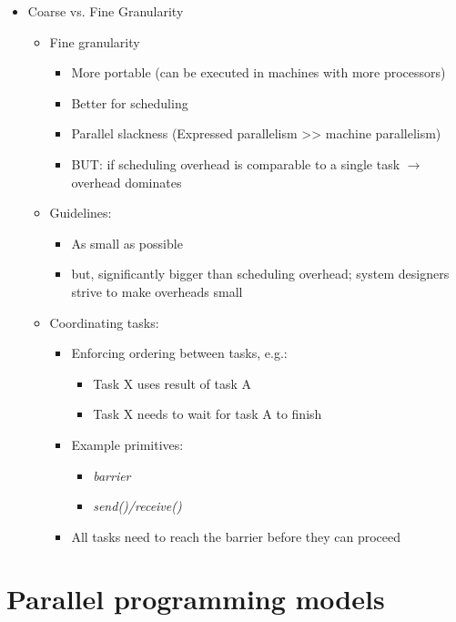 \documentclass[a4paper]{article}
\begin{document}
\begin{itemize}
\begin{itemize}
\begin{itemize}
\begin{itemize}
\end{itemize}
\end{itemize}
\end{itemize}
\item Coarse vs. Fine Granularity
\begin{itemize}
\item Fine granularity
\begin{itemize}
\item More portable (can be executed in machines with more processors)
\item Better for scheduling 
\item Parallel slackness (Expressed parallelism >> machine parallelism)
\item BUT: if scheduling overhead is comparable to a single task $\to$ overhead dominates
\end{itemize}
\item Guidelines:
\begin{itemize}
\item As small as possible
\item but, significantly bigger than scheduling overhead; system designers strive to make overheads small
\end{itemize}
\item Coordinating tasks:
\begin{itemize}
\item Enforcing ordering between tasks, e.g.:
\begin{itemize}
\item Task X uses result of task A
\item Task X needs to wait for task A to finish
\end{itemize}
\item Example primitives:
\begin{itemize}
\item \emph{barrier}
\item \emph{send()/receive()}
\end{itemize}
\item All tasks need to reach the barrier before they can proceed
\end{itemize}
\end{itemize}
\end{itemize}

\section{Parallel programming models}
\end{document}
